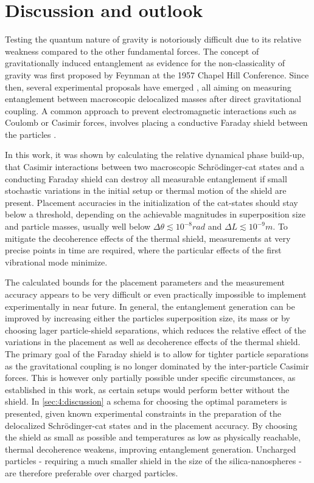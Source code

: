 \chapter{Discussion and outlook}\label{cha:discussion-outlook}
Testing the quantum nature of gravity is notoriously difficult due to its relative weakness compared to the other fundamental forces.
The concept of gravitationally induced entanglement as evidence for the non-classicality of gravity was first proposed by Feynman at the 1957 Chapel Hill Conference.
Since then, several experimental proposals have emerged \cite{Bose_2017, Krisnanda_2020}, all aiming on measuring entanglement between macroscopic delocalized masses after direct gravitational coupling.
A common approach to prevent electromagnetic interactions such as Coulomb or Casimir forces, involves placing a conductive Faraday shield between the particles \cite{Kamp_2020}.

In this work, it was shown by calculating the relative dynamical phase build-up, that Casimir interactions between two macroscopic Schrödinger-cat states and a conducting Faraday shield can destroy all measurable entanglement if small stochastic variations in the initial setup or thermal motion of the shield are present.
Placement accuracies in the initialization of the cat-states should stay below a threshold, depending on the achievable magnitudes in superposition size and particle masses, usually well below $\Delta \theta \lesssim 10^{-8}\si{rad}$ and $\Delta L \lesssim 10^{-9}\si{m}$.
To mitigate the decoherence effects of the thermal shield, measurements at very precise points in time are required, where the particular effects of the first vibrational mode minimize.

The calculated bounds for the placement parameters and the measurement accuracy appears to be very difficult or even practically impossible to implement experimentally in near future.
In general, the entanglement generation can be improved by increasing either the particles superposition size, its mass or by choosing lager particle-shield separations, which reduces the relative effect of the variations in the placement as well as decoherence effects of the thermal shield.
The primary goal of the Faraday shield is to allow for tighter particle separations as the gravitational coupling is no longer dominated by the inter-particle Casimir forces.
This is however only partially possible under specific circumstances, as established in this work, as certain setups would perform better without the shield.
In \cref{sec:4:discussion} a schema for choosing the optimal parameters is presented, given known experimental constraints in the preparation of the delocalized Schrödinger-cat states and in the placement accuracy.
By choosing the shield as small as possible and temperatures as low as physically reachable, thermal decoherence weakens, improving entanglement generation.
Uncharged particles - requiring a much smaller shield in the size of the silica-nanospheres - are therefore preferable over charged particles.



